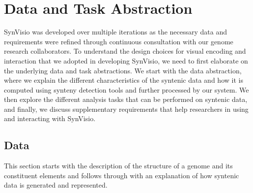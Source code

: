 \chapter{Data and Task Abstraction}

SynVisio was developed over multiple iterations as the necessary data and requirements were refined through continuous consultation with our genome research collaborators. To understand the design choices for visual encoding and interaction that we adopted in developing SynVisio, we need to first elaborate on the underlying data and task abstractions. We start with the data abstraction, where we explain the different characteristics of the syntenic data and how it is computed using synteny detection tools and further processed by our system. We then explore the different analysis tasks that can be performed on syntenic data, and finally, we discuss supplementary requirements that help researchers in using and interacting with SynVisio.

\section{Data}
This section starts with the description of the structure of a genome and its constituent elements and follows through with an explanation of how syntenic data is generated and represented.

